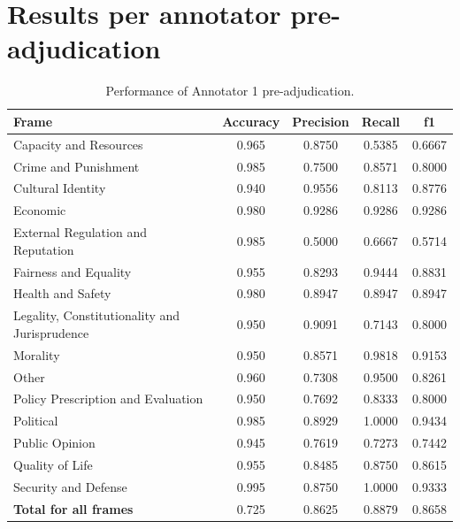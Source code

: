 \documentclass[
10pt, %
a4paper, %
oneside, %
headinclude,footinclude, %
] {book}%
\begin{document}
\section{Results per annotator pre-adjudication}
\begin{table}[htbp]
\centering
\begin{tabular}{|l|c|c|c|c|}
\hline
\textbf{Frame} & \textbf{Accuracy} & \textbf{Precision} & \textbf{Recall} & \textbf{f1} \\
\hline
Capacity and Resources & 0.965 & 0.8750 & 0.5385 & 0.6667 \\\hline
Crime and Punishment & 0.985 & 0.7500 & 0.8571 & 0.8000 \\\hline
Cultural Identity & 0.940 & 0.9556 & 0.8113 & 0.8776 \\\hline
Economic & 0.980 & 0.9286 & 0.9286 & 0.9286 \\\hline
External Regulation and Reputation & 0.985 & 0.5000 & 0.6667 & 0.5714 \\\hline
Fairness and Equality & 0.955 & 0.8293 & 0.9444 & 0.8831 \\\hline
Health and Safety & 0.980 & 0.8947 & 0.8947 & 0.8947 \\\hline
Legality, Constitutionality and Jurisprudence & 0.950 & 0.9091 & 0.7143 & 0.8000 \\\hline
Morality & 0.950 & 0.8571 & 0.9818 & 0.9153 \\\hline
Other & 0.960 & 0.7308 & 0.9500 & 0.8261 \\\hline
Policy Prescription and Evaluation & 0.950 & 0.7692 & 0.8333 & 0.8000 \\\hline
Political & 0.985 & 0.8929 & 1.0000 & 0.9434 \\\hline
Public Opinion & 0.945 & 0.7619 & 0.7273 & 0.7442 \\\hline
Quality of Life & 0.955 & 0.8485 & 0.8750 & 0.8615 \\\hline
Security and Defense & 0.995 & 0.8750 & 1.0000 & 0.9333 \\
\hline
\textbf{Total for all frames} & 0.725 & 0.8625 & 0.8879 & 0.8658 \\
\hline
\end{tabular}
\caption{Performance of Annotator 1 pre-adjudication.}
\label{tab:pre_annotator1_performance}
\end{table}
\end{document}
